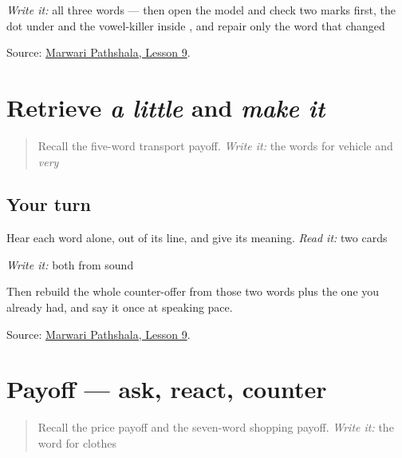 \emph{Write it:} all three words — then open the model and check two marks first, the dot under \textbf{} and the vowel-killer inside \textbf{}, and repair only the word that changed

\begin{tcolorbox}[breakable,colback=teal!4,colframe=teal!35!black,title={Before you move on}]
Source: \href{https://www.marwaripathshala.com/marwari-lesson-9-english}{Marwari Pathshala, Lesson 9}.
\end{tcolorbox}
\section[Practice]{Retrieve \emph{a little} and \emph{make it}}

\label{lesson:MW-R23-bargain-two}



\begin{quote}
Recall the five-word transport payoff. \emph{Write it:} the words for vehicle and \emph{very}
\end{quote}

\subsection*{Your turn}
Hear each word alone, out of its line, and give its meaning. \emph{Read it:} two cards

\emph{Write it:} both from sound

Then rebuild the whole counter-offer from those two words plus the one you already had, and say it once at speaking pace.

\begin{tcolorbox}[breakable,colback=teal!4,colframe=teal!35!black,title={Before you move on}]
Source: \href{https://www.marwaripathshala.com/marwari-lesson-9-english}{Marwari Pathshala, Lesson 9}.
\end{tcolorbox}
\section[Practice]{Payoff — ask, react, counter}

\label{lesson:MW-C23-counter-four}



\begin{quote}
Recall the price payoff and the seven-word shopping payoff. \emph{Write it:} the word for clothes
\end{quote}

